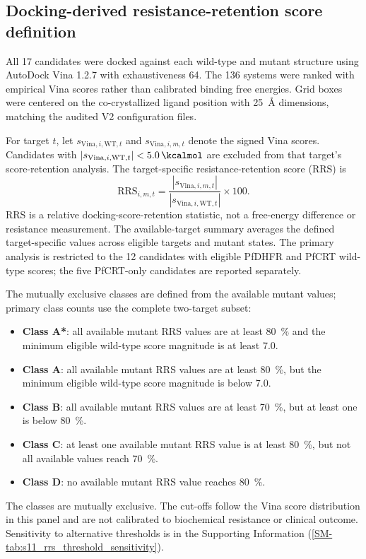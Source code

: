 \documentclass[journal=jcisd8,manuscript=article,layout=traditional]{achemso}
\begin{document}
\subsection{Docking-derived resistance-retention score definition}\label{sec:rrs_formula}

All 17 candidates were docked against each wild-type and mutant structure using AutoDock Vina 1.2.7 with exhaustiveness \num{64}. The 136 systems were ranked with empirical Vina scores rather than calibrated binding free energies. Grid boxes were centered on the co-crystallized ligand position with \qty{25}{\angstrom} dimensions, matching the audited V2 configuration files.

For target $t$, let $s_{\mathrm{Vina},i,\mathrm{WT},t}$ and $s_{\mathrm{Vina},i,m,t}$ denote the signed Vina scores. Candidates with $|s_{\mathrm{Vina},i,\mathrm{WT},t}| < \qty{5.0}{\kcalmol}$ are excluded from that target's score-retention analysis. The target-specific resistance-retention score (RRS) is
\begin{equation}
\mathrm{RRS}_{i,m,t} = \frac{|s_{\mathrm{Vina},i,m,t}|}{|s_{\mathrm{Vina},i,\mathrm{WT},t}|} \times 100.
\end{equation}
RRS is a relative docking-score-retention statistic, not a free-energy difference or resistance measurement. The available-target summary averages the defined target-specific values across eligible targets and mutant states. The primary analysis is restricted to the 12 candidates with eligible PfDHFR and PfCRT wild-type scores; the five PfCRT-only candidates are reported separately.

The mutually exclusive classes are defined from the available mutant values; primary class counts use the complete two-target subset:
\begin{itemize}
    \item \textbf{Class A*}: all available mutant RRS values are at least \qty{80}{\percent} and the minimum eligible wild-type score magnitude is at least \qty{7.0}{\kcalmol}.
    \item \textbf{Class A}: all available mutant RRS values are at least \qty{80}{\percent}, but the minimum eligible wild-type score magnitude is below \qty{7.0}{\kcalmol}.
    \item \textbf{Class B}: all available mutant RRS values are at least \qty{70}{\percent}, but at least one is below \qty{80}{\percent}.
    \item \textbf{Class C}: at least one available mutant RRS value is at least \qty{80}{\percent}, but not all available values reach \qty{70}{\percent}.
    \item \textbf{Class D}: no available mutant RRS value reaches \qty{80}{\percent}.
\end{itemize}
The classes are mutually exclusive. The cut-offs follow the Vina score distribution in this panel and are not calibrated to biochemical resistance or clinical outcome. Sensitivity to alternative thresholds is in the Supporting Information (\cref{SM-tab:s11_rrs_threshold_sensitivity}).
\end{document}
